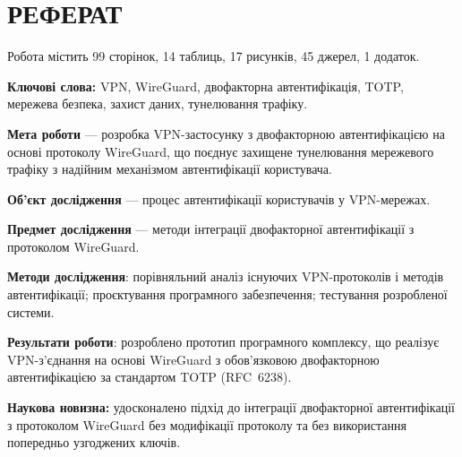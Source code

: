\chapter*{РЕФЕРАТ}
\thispagestyle{fancy}

Робота містить 99 сторінок, 14 таблиць, 17 рисунків, 45 джерел, 1 додаток.

\textbf{Ключові слова:} VPN, WireGuard, двофакторна автентифікація, TOTP,
мережева безпека, захист даних, тунелювання трафіку.

\textbf{Мета роботи} --- розробка VPN-застосунку з двофакторною автентифікацією
на основі протоколу WireGuard, що поєднує захищене тунелювання мережевого
трафіку з надійним механізмом автентифікації користувача.

\textbf{Об'єкт дослідження} --- процес автентифікації користувачів у VPN-мережах.

\textbf{Предмет дослідження} --- методи інтеграції двофакторної
автентифікації з протоколом WireGuard.

\textbf{Методи дослідження}: порівняльний аналіз існуючих VPN-протоколів
і методів автентифікації; проєктування програмного забезпечення;
тестування розробленої системи.

\textbf{Результати роботи}: розроблено прототип програмного комплексу,
що реалізує VPN-з'єднання на основі WireGuard з обов'язковою двофакторною
автентифікацією за стандартом TOTP (RFC~6238).

\textbf{Наукова новизна:} удосконалено підхід до інтеграції двофакторної
автентифікації з протоколом WireGuard без модифікації протоколу та без
використання попередньо узгоджених ключів.

\newpage
